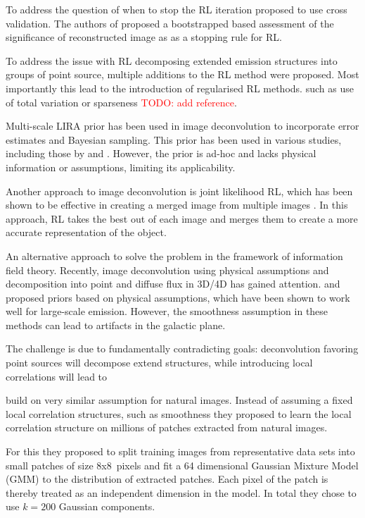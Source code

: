 \documentclass[twocolumn]{aastex631}
\newcommand{\todo}[1]{\textcolor{red}{TODO: #1}\PackageWarning{TODO:}{#1!}}
\begin{document}
    To address the question of when to stop the RL iteration \cite{Reeves1995} proposed to use cross validation. The authors of \citep{Bi1994} proposed a bootstrapped based assessment of the significance of reconstructed image as as a stopping rule for RL.
    
    To address the issue with RL decomposing extended emission structures into groups of point source, multiple additions to the RL method were proposed. Most importantly this lead to the introduction of regularised RL methods.
    such as use of total variation \citep{Dey2006} or sparseness \todo{add reference}.

    Multi-scale LIRA prior has been used in image deconvolution to incorporate error estimates and Bayesian sampling. This prior has been used in various studies, including those by \cite{Esch2004} and \cite{Connors2011}. However, the prior is ad-hoc and lacks physical information or assumptions, limiting its applicability.

    Another approach to image deconvolution is joint likelihood RL, which has been shown to be effective in creating a merged image from multiple images \cite{Ingaramo2014}. In this approach, RL takes the best out of each image and merges them to create a more accurate representation of the object.

    An alternative approach to solve the problem in the framework of information field theory. Recently, image deconvolution using physical assumptions and decomposition into point and diffuse flux in 3D/4D has gained attention. \cite{Pumpe2018} and \cite{Selig2015} proposed priors based on physical assumptions, which have been shown to work well for large-scale emission. However, the smoothness assumption in these methods can lead to artifacts in the galactic plane.

    The challenge is due to fundamentally contradicting goals: deconvolution favoring point sources will decompose extend structures, while introducing local correlations will lead to 
    
    \cite{Zoran2011} build on very similar assumption for natural images.
    Instead of assuming a fixed local correlation structures, such as smoothness
    they proposed to learn the local correlation structure on millions of patches
    extracted from natural images. 
    
    For this they proposed to split training images from representative
    data sets into small patches of size 8x8~pixels and fit a 64 dimensional
    Gaussian Mixture Model (GMM) to the distribution of extracted patches. Each pixel of the patch 
    is thereby treated as an independent dimension in the model. In total
    they chose to use $k=200$ Gaussian components.
    
\end{document}
